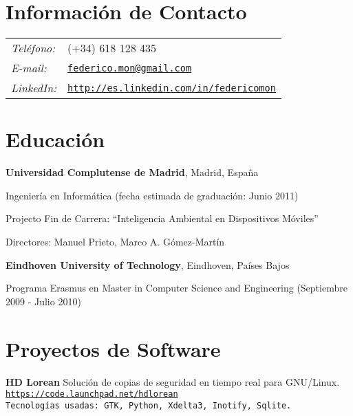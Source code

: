 \documentclass[margin,line]{resume}
\begin{document}

\begin{resume}
\section{\sc Información de Contacto}
\vspace{.05in}
\begin{tabular}{@{}p{0.5in}p{2in}}
{\it Teléfono:} &(+34) 618 128 435 \\
{\it E-mail:} &{ \tt \href{mailto:federico.mon@gmail.com}{federico.mon@gmail.com}}\\
{\it LinkedIn:} &{ \tt \href{http://es.linkedin.com/in/federicomon}{http://es.linkedin.com/in/federicomon}}\\
\end{tabular}


\section{\sc Educación}
{\bf Universidad Complutense de Madrid}, Madrid, España\\
\vspace*{-.1in}
\begin{list1}
\item[] Ingeniería en Informática (fecha estimada
  de graduación: Junio 2011)
\begin{list2}
\vspace*{.05in}
\item Projecto Fin de Carrera:  ``Inteligencia Ambiental en Dispositivos Móviles'' 
\item Directores:  Manuel Prieto, Marco A. Gómez-Martín
\end{list2}
\end{list1}

{\bf Eindhoven University of Technology}, Eindhoven, Países Bajos\\
\vspace*{-.1in}
\begin{list1}
\item[] Programa Erasmus en Master in Computer Science and Engineering (Septiembre 2009 - Julio 2010)
\end{list1}

\section{\sc Proyectos de Software } 
\begin{list1}
\item[] {\bf HD Lorean}
Solución de copias de seguridad en tiempo real para GNU/Linux.\\
\tt{\href{https://code.launchpad.net/hdlorean}{https://code.launchpad.net/hdlorean}\\
Tecnologías usadas: GTK, Python, Xdelta3, Inotify, Sqlite.\\

}
\end{list1}
\end{resume}
\end{document}

